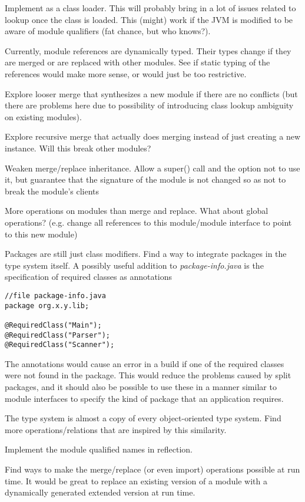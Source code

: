 Implement as a class loader. This will probably bring in a lot of issues related to
lookup once the class is loaded. This (might) work if the JVM is modified to
be aware of module qualifiers (fat chance, but who knows?).

Currently, module references are dynamically typed. Their types change if they
are merged or are replaced with other modules. See if static typing of the 
references would make more sense, or would just be too restrictive.

Explore looser merge that synthesizes a new module if there are no conflicts
(but there are problems here due to possibility of introducing class lookup ambiguity
on existing modules).

Explore recursive merge that actually does merging instead of just creating a
new instance. Will this break other modules?

Weaken merge/replace inheritance. Allow a super() call and the option not to use it, 
but guarantee that the signature of the module is not changed so as not to break
the module's clients

More operations on modules than merge and replace. What about global operations? (e.g.
change all references to this module/module interface to point to this new module)

Packages are still just class modifiers. Find a way to integrate packages in the type
system itself. A possibly useful addition to \textit{package-info.java} is the specification
of required classes as annotations

\begin{lstlisting}
//file package-info.java
package org.x.y.lib;

@RequiredClass("Main");
@RequiredClass("Parser");
@RequiredClass("Scanner");
\end{lstlisting}

The annotations would cause an error in a build if one of the required classes were not
found in the package. This would reduce the problems caused by split packages, and it should
also be possible to use these in a manner similar to module interfaces to specify the kind
of package that an application requires.

The type system is almost a copy of every object-oriented type system. Find more
operations/relations that are inspired by this similarity.

Implement the module qualified names in reflection.

Find ways to make the merge/replace (or even import) operations possible at run time.
It would be great to replace an existing version of a module with a dynamically generated
extended version at run time.